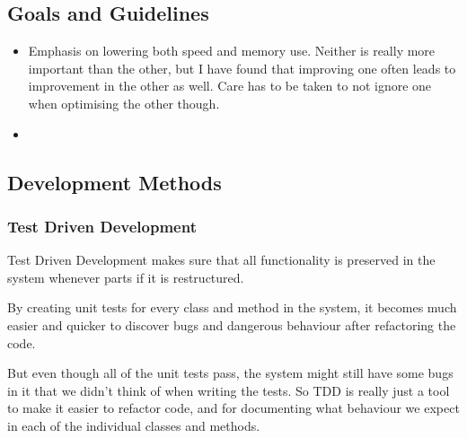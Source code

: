 \documentclass[conference]{IEEEtran}
\begin{document}
\newpage
\subsection{Goals and Guidelines}
\begin{itemize}
	\item Emphasis on lowering both speed and memory use.
	\subitem Neither is really more important than the other, but I have found that improving one often leads to improvement in the other as well.
	\subsubitem Care has to be taken to not ignore one when optimising the other though.
	\item
\end{itemize}

\subsection{Development Methods}
\subsubsection{Test Driven Development}
Test Driven Development makes sure that all functionality is preserved in the system whenever parts if it is restructured.

By creating unit tests for every class and method in the system, it becomes much easier and quicker to discover bugs and dangerous behaviour after refactoring the code.

But even though all of the unit tests pass, the system might still have some bugs in it that we didn't think of when writing the tests. So TDD is really just a tool to make it easier to refactor code, and for documenting what behaviour we expect in each of the individual classes and methods.
\end{document}
